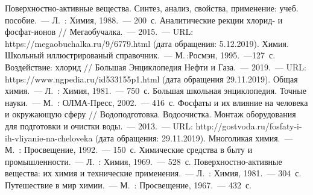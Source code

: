 \begin{thebibliography}{99}
\bibitem{} Поверхностно-активные вещества. Синтез, анализ, свойства, применение: учеб. пособие.~--- Л.~: Химия, 1988.~--- 200~с.
\bibitem{}Аналитические рекции хлорид- и фосфат-ионов // Мегаобучалка.~--- 2015.~--- URL: https://megaobuchalka.ru/9/6779.html (дата обращения: 5.12.2019).
\bibitem{} Химия. Школьный иллюстрированый справочник.~--- М.\,:Росмэн, 1995.~---127~с.
\bibitem{}Воздействие: хлорид // Большая Энциклопедия Нефти и Газа.~--- 2019.~--- URL: https://www.ngpedia.ru/id533155p1.html (дата обращения 29.11.2019).
\bibitem{} Общая химия.~--- Л.~: Химия, 1981.~--- 750~с.
\bibitem{} Большая школьная энциклопедия. Точные науки.~--- М.~: ОЛМА-Пресс, 2002.~--- 416~с.
\bibitem{}Фосфаты и их влияние на человека и окружающую сферу // Водоподготовка. Водоочистка. Монтаж оборудования для подготовки и очистки воды.~--- 2013.~--- URL: http://gostvoda.ru/fosfaty-i-ih-vliyanie-na-cheloveka (дата обращения: 29.11.2019).
\bibitem{} Многоликая химия.~--- М.~: Просвещение, 1992.~--- 150~с.
\bibitem{} Химические средства в быту и промышленности.~--- Л.~: Химия, 1969.~--- 528~с.
\bibitem{} Поверхностно-активные вещества: их химия и технические применения.~--- Л.~: Химия, 1981.~--- 304~с.
\bibitem{} Путешествие в мир химии.~--- М.~: Просвещение, 1967.~--- 432~с.
\end{thebibliography}
